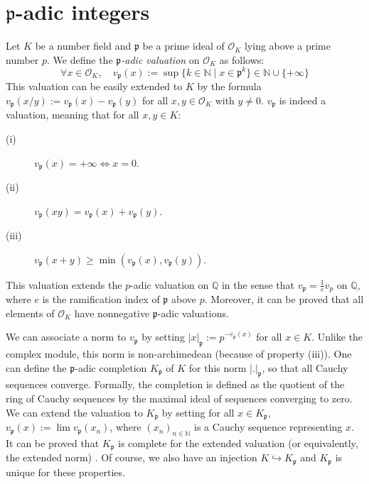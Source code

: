 \documentclass[a4paper,10pt]{report}
\theoremstyle{definition}
\theoremstyle{plain}
\theoremstyle{definition}
\newcommand{\N}{\mathbb{N}}
\newcommand{\Q}{\mathbb{Q}}
\newcommand{\mO}{\mathcal{O}}
\renewcommand{\(}{\left(}
\renewcommand{\)}{\right)}
\newcommand{\mf}[1]{\mathfrak{#1}}
\begin{document}
\section{$\mf{p}$-adic integers}

Let $K$ be a number field and $\mf{p}$ be a prime ideal of $\mO_K$ lying above a prime number $p$. We define the \emph{$\mf{p}$-adic valuation} on $\mO_K$ as follows:
\[\forall x\in\mO_K, \quad v_{\mf{p}}(x):=\sup\{k\in\N\mid x\in\mf{p}^k\}\in\N\cup\{+\infty\}\]
This valuation can be easily extended to $K$ by the formula $v_{\mf{p}}(x/y):=v_{\mf{p}}(x)-v_{\mf{p}}(y)$ for all $x,y\in\mO_K$ with $y\neq 0$.  $v_{\mf{p}}$ is indeed a valuation, meaning that for all $x,y\in K$:
\begin{description}
\item[(i)] $v_{\mf{p}}(x)=+\infty\Longleftrightarrow x=0$.
\item[(ii)] $v_{\mf{p}}(xy)=v_{\mf{p}}(x)+v_{\mf{p}}(y)$.
\item[(iii)] $v_{\mf{p}}(x+y)\geq\min(v_{\mf{p}}(x),v_{\mf{p}}(y))$.
\end{description}
This valuation extends the $p$-adic valuation on $\Q$ in the sense that $v_{\mf{p}}=\frac{1}{e}v_p$ on $\Q$, where $e$ is the ramification index of $\mf{p}$ above $p$. Moreover, it can be proved that all elements of $\mO_K$ have nonnegative $\mf{p}$-adic valuations.  

We can associate a norm to $v_{\mf{p}}$ by setting $|x|_{\mf{p}}:=p^{-v_{\mf{p}}(x)}$ for all $x\in K$. Unlike the complex module, this norm is non-archimedean (because of property (iii)). One can define the $\mf{p}$-adic completion $K_{\mf{p}}$ of $K$ for this norm $|.|_{\mf{p}}$, so that all Cauchy sequences converge.  Formally, the completion is defined as the quotient of the ring of Cauchy sequences by the maximal ideal of sequences converging to zero. We can extend the valuation to $K_{\mf{p}}$ by setting for all $x\in K_{\mf{p}}$, $v_{\mf{p}}(x):=\lim v_{\mf{p}}(x_n)$, where $(x_n)_{n\in\N}$ is a Cauchy sequence representing $x$.  It can be proved that $K_{\mf{p}}$ is complete for the extended valuation (or equivalently, the extended norm) \cite[theorem II.2.1]{Janusz}. Of course, we also have an injection $K\hookrightarrow K_{\mf{p}}$ and $K_{\mf{p}}$ is unique for these properties. 
\end{document}
